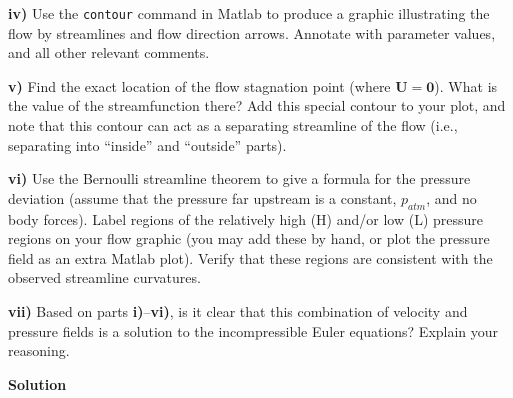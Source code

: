 \documentclass{article}
\def\*#1{\mathbf{#1}}
\begin{document}
\textbf{iv)} Use the \texttt{contour} command in Matlab to produce a
graphic illustrating the flow by streamlines and flow direction arrows.
Annotate with parameter values, and all other relevant comments.

\textbf{v)} Find the exact location of the flow stagnation point (where
$\*U = \*0$). What is the value of the streamfunction there? Add this
special contour to your plot, and note that this contour can act as a
separating streamline of the flow (i.e., separating into ``inside'' and
``outside'' parts).

\textbf{vi)} Use the Bernoulli streamline theorem to give a formula for
the pressure deviation (assume that the pressure far upstream is a
constant, $p_{atm}$, and no body forces). Label regions of the
relatively high (H) and/or low (L) pressure regions on your flow graphic
(you may add these by hand, or plot the pressure field as an extra
Matlab plot). Verify that these regions are consistent with the observed
streamline curvatures.

\textbf{vii)} Based on parts \textbf{i)}--\textbf{vi)}, is it clear that
this combination of velocity and pressure fields is a solution to the
incompressible Euler equations? Explain your reasoning.

\newpage

\textbf{Solution}
\end{document}
